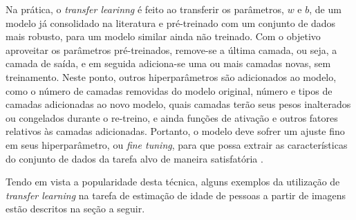 Na prática, o \emph{transfer learinng} é feito ao transferir os parâmetros, $w$ e $b$, de um modelo já consolidado na literatura e pré-treinado com um conjunto de dados mais robusto, para um modelo similar ainda não treinado. Com o objetivo aproveitar os parâmetros pré-treinados, remove-se a última camada, ou seja, a camada de saída, e em seguida adiciona-se uma ou mais camadas novas, sem treinamento. Neste ponto, outros hiperparâmetros são adicionados ao modelo, como o número de camadas removidas do modelo original, número e tipos de camadas adicionadas ao novo modelo, quais camadas terão seus pesos inalterados ou congelados durante o re-treino, e ainda funções de ativação e outros fatores relativos às camadas adicionadas. Portanto, o modelo deve sofrer um ajuste fino em seus hiperparâmetro, ou \emph{fine tuning}, para que possa extrair as características do conjunto de dados da tarefa alvo de maneira satisfatória \cite{oquab2014learning}.

Tendo em vista a popularidade desta técnica, alguns exemplos da utilização de \emph{transfer learning} na tarefa de estimação de idade de pessoas a partir de imagens estão descritos na seção a seguir.
